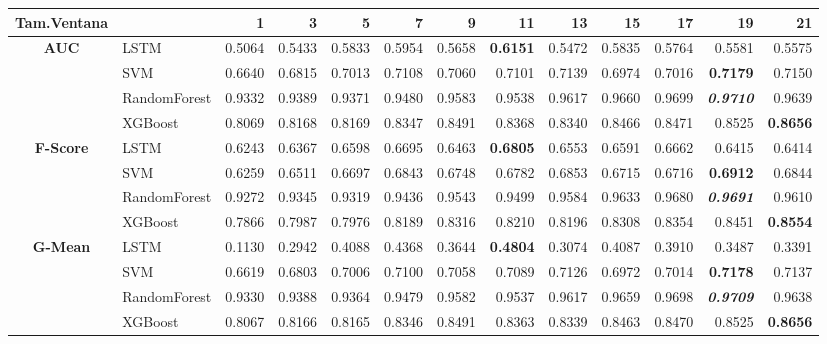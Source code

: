 \begin{table}[H]
	\centering
	\begin{adjustbox}{max width=14cm}
		\begin{tabular}{|c|l|r|r|r|r|r|r|r|r|r|r|r|}
			\hline
			\textbf{Tam.Ventana} &         &      1  &      3  &      5  &      7  &      9  &      11 &      13 &      15 &      17 &      19 &      21 \\
			\hline
			\textbf{AUC} &  LSTM &  0.5064 &  0.5433 &  0.5833 &  0.5954 &  0.5658 & \textbf{  0.6151 } &  0.5472 &  0.5835 &  0.5764 &  0.5581 &  0.5575 \\
			&  SVM &  0.6640 &  0.6815 &  0.7013 &  0.7108 &  0.7060 &  0.7101 &  0.7139 &  0.6974 &  0.7016 & \textbf{  0.7179 } &  0.7150 \\
			&  RandomForest &  0.9332 &  0.9389 &  0.9371 &  0.9480 &  0.9583 &  0.9538 &  0.9617 &  0.9660 &  0.9699 & \textit{ \textbf{  0.9710 } } &  0.9639 \\
			&  XGBoost &  0.8069 &  0.8168 &  0.8169 &  0.8347 &  0.8491 &  0.8368 &  0.8340 &  0.8466 &  0.8471 &  0.8525 & \textbf{  0.8656 } \\
			\hline
			\textbf{F-Score} &  LSTM &  0.6243 &  0.6367 &  0.6598 &  0.6695 &  0.6463 & \textbf{  0.6805 } &  0.6553 &  0.6591 &  0.6662 &  0.6415 &  0.6414 \\
			&  SVM &  0.6259 &  0.6511 &  0.6697 &  0.6843 &  0.6748 &  0.6782 &  0.6853 &  0.6715 &  0.6716 & \textbf{  0.6912 } &  0.6844 \\
			&  RandomForest &  0.9272 &  0.9345 &  0.9319 &  0.9436 &  0.9543 &  0.9499 &  0.9584 &  0.9633 &  0.9680 & \textit{ \textbf{  0.9691 } } &  0.9610 \\
			&  XGBoost &  0.7866 &  0.7987 &  0.7976 &  0.8189 &  0.8316 &  0.8210 &  0.8196 &  0.8308 &  0.8354 &  0.8451 & \textbf{  0.8554 } \\
			\hline
			\textbf{G-Mean} &  LSTM &  0.1130 &  0.2942 &  0.4088 &  0.4368 &  0.3644 & \textbf{  0.4804 } &  0.3074 &  0.4087 &  0.3910 &  0.3487 &  0.3391 \\
			&  SVM &  0.6619 &  0.6803 &  0.7006 &  0.7100 &  0.7058 &  0.7089 &  0.7126 &  0.6972 &  0.7014 & \textbf{  0.7178 } &  0.7137 \\
			&  RandomForest &  0.9330 &  0.9388 &  0.9364 &  0.9479 &  0.9582 &  0.9537 &  0.9617 &  0.9659 &  0.9698 & \textit{ \textbf{  0.9709 } } &  0.9638 \\
			&  XGBoost &  0.8067 &  0.8166 &  0.8165 &  0.8346 &  0.8491 &  0.8363 &  0.8339 &  0.8463 &  0.8470 &  0.8525 & \textbf{  0.8656 } \\

\end{tabular}
\end{adjustbox}
\end{table}

